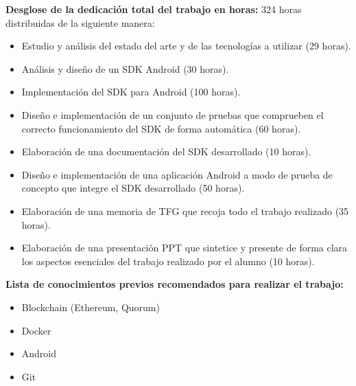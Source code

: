 \documentclass{article}
\begin{document}
\vspace{1cm}
\textbf{Desglose de la dedicación total del trabajo en horas:}
324 horas distribuidas de la siguiente manera:

\begin{itemize}
  \item Estudio y análisis del estado del arte y de las tecnologías a utilizar (29 horas).
  \item Análisis y diseño de un SDK Android (30 horas).
  \item Implementación del SDK para Android (100 horas).
  \item Diseño e implementación de un conjunto de pruebas que comprueben el correcto funcionamiento del SDK de forma automática (60 horas).
  \item Elaboración de una documentación del SDK desarrollado (10 horas).
  \item Diseño e implementación de una aplicación Android a modo de prueba de concepto que integre el SDK desarrollado (50 horas).
  \item Elaboración de una memoria de TFG que recoja todo el trabajo realizado (35 horas).
  \item Elaboración de una presentación PPT que sintetice y presente de forma clara los aspectos esenciales del trabajo realizado por el alumno (10 horas).
\end{itemize}

\vspace{1cm}
\textbf{Lista de conocimientos previos recomendados para realizar el trabajo:}
\begin{itemize}
  \item Blockchain (Ethereum, Quorum)
  \item Docker
  \item Android
  \item Git
\end{itemize}
\end{document}
